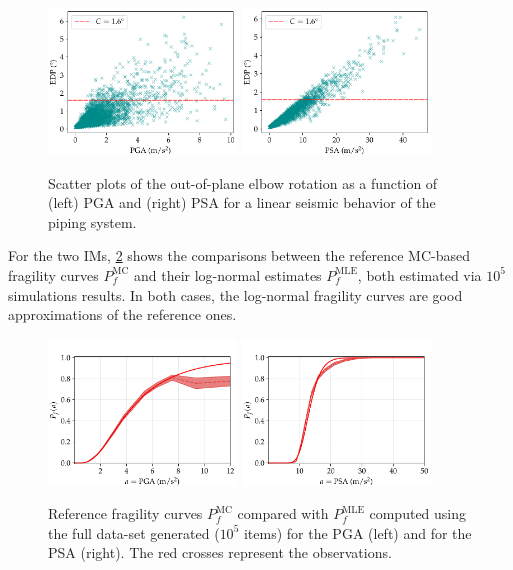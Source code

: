     \begin{figure}[!ht]
        \centering
         {\includegraphics[width=5cm]{figures/uncIM/cloud_PGA.pdf}}
         {\includegraphics[width=5cm]{figures/uncIM/cloud_PSA.pdf}}
        \caption{Scatter plots of the out-of-plane elbow rotation as a function of (left) PGA and (right) PSA for a linear seismic behavior of the piping system.}
         \label{uncIM:fig:scatterplots_PSA_PGA}
    \end{figure}
    
    For the two IMs, \cref{uncIM:fig:ref-ASG} shows the comparisons between the reference MC-based fragility curves $P_f^{\mathrm{MC}}$ and their log-normal estimates $P_f^{\mathrm{MLE}}$, both estimated via $10^5$ simulations results. In both cases, the log-normal fragility curves are good approximations of the reference ones.

    \begin{figure}[!ht]
        \centering
         {\includegraphics[width=5cm]{figures/uncIM/ref_ASG_PGA.pdf}}
         {\includegraphics[width=5cm]{figures/uncIM/ref_ASG_PSA.pdf}}
        \caption{Reference fragility curves $P_f^{\mathrm{MC}}$ compared with $P_f^{\mathrm{MLE}}$ computed using the full data-set generated ($10^5$ items) for the PGA (left) and for the PSA (right). The red crosses represent the observations.}
         \label{uncIM:fig:ref-ASG}
    \end{figure}
    
